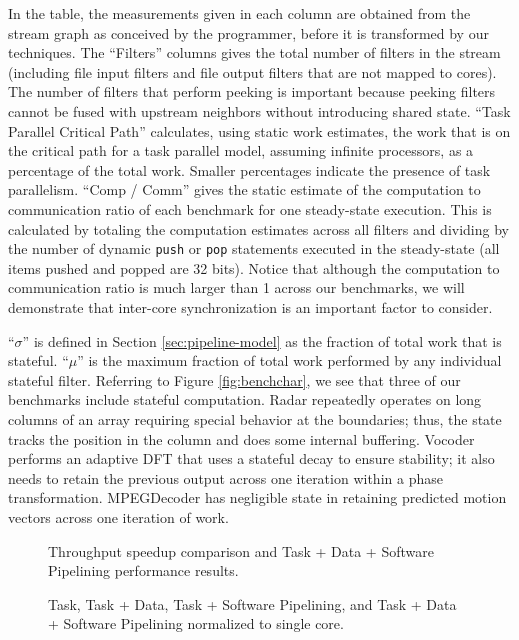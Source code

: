 In the table, the measurements given in each column are obtained from
the stream graph as conceived by the programmer, before it is
transformed by our techniques.  The ``Filters'' columns gives the
total number of filters in the stream (including file input filters
and file output filters that are not mapped to cores).  The number of
filters that perform peeking is important because peeking filters
cannot be fused with upstream neighbors without introducing shared
state. ``Task Parallel Critical Path'' calculates, using static work
estimates, the work that is on the critical path for a task parallel
model, assuming infinite processors, as a percentage of the total
work.  Smaller percentages indicate the presence of task parallelism.
``Comp / Comm'' gives the static estimate of the computation to
communication ratio of each benchmark for one steady-state
execution. This is calculated by totaling the computation estimates
across all filters and dividing by the number of dynamic {\tt push} or
{\tt pop} statements executed in the steady-state (all items pushed
and popped are 32 bits). Notice that although the computation to
communication ratio is much larger than 1 across our benchmarks, we
will demonstrate that inter-core synchronization is an important
factor to consider.

``$\sigma$'' is defined in Section \ref{sec:pipeline-model} as the
fraction of total work that is stateful.  ``$\mu$'' is the maximum
fraction of total work performed by any individual stateful
filter. Referring to Figure \ref{fig:benchchar}, we see that three of
our benchmarks include stateful computation.  Radar repeatedly
operates on long columns of an array requiring special behavior at the
boundaries; thus, the state tracks the position in the column and does
some internal buffering.  Vocoder performs an adaptive DFT that uses a
stateful decay to ensure stability; it also needs to retain the
previous output across one iteration within a phase transformation.
MPEGDecoder has negligible state in retaining predicted motion vectors
across one iteration of work.

\begin{figure*}[t]
\centering
{}
\caption{Throughput speedup comparison and Task + Data + Software Pipelining performance results.
\protect\label{fig:thruput}}
\vspace{-6pt}
\end{figure*}

\begin{figure*}[t]
\centering
{}
\caption{Task, Task + Data, Task + Software Pipelining, and Task + Data + Software Pipelining
normalized to single core.
\protect\label{fig:main_comp}}
\vspace{-6pt}
\end{figure*}

